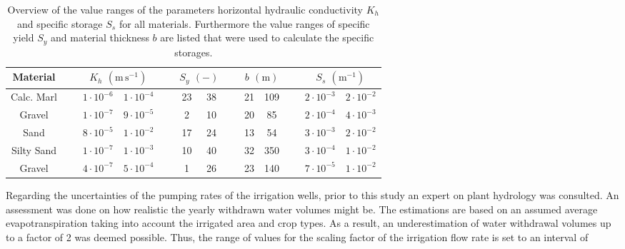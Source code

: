 \begin{table}[h]
    \label{Tab-MatPropsRange}
    \caption{Overview of the value ranges of the parameters horizontal hydraulic conductivity $K_h$ and specific storage $S_s$ for all materials. Furthermore the value ranges of specific yield $S_y$ and material thickness $b$ are listed that were used to calculate the specific storages.}
    \begin{tabular}{clcclcclcclcc}
        Material   & $\; \;$ & \multicolumn{2}{c}{$K_h$ $(\textrm{m} \, \textrm{s}^{-1})$} & $\; \;$ & \multicolumn{2}{c}{$S_y$ $(-)$} & $\; \;$ & \multicolumn{2}{c}{$b$ $(\textrm{m})$} & $\; \;$ & \multicolumn{2}{c}{$S_s$ $(\textrm{m}^{-1})$} \\ \hline
        Calc. Marl &         & $1 \cdot 10^{-6}$            & $1 \cdot 10^{-4}$            &         & 23             & 38             &         & 21                & 109                &         & $2 \cdot 10^{-3}$     & $2 \cdot 10^{-2}$     \\
        Gravel     &         & $1 \cdot 10^{-7}$            & $9 \cdot 10^{-5}$            &         & 2              & 10             &         & 20                & 85                 &         & $2 \cdot 10^{-4}$     & $4 \cdot 10^{-3}$     \\
        Sand       &         & $8 \cdot 10^{-5}$            & $1 \cdot 10^{-2}$            &         & 17             & 24             &         & 13                & 54                 &         & $3 \cdot 10^{-3}$     & $2 \cdot 10^{-2}$     \\
        Silty Sand &         & $1 \cdot 10^{-7}$            & $1 \cdot 10^{-3}$            &         & 10             & 40             &         & 32                & 350                &         & $3 \cdot 10^{-4}$     & $1 \cdot 10^{-2}$     \\
        Gravel     &         & $4 \cdot 10^{-7}$            & $5 \cdot 10^{-4}$            &         & 1              & 26             &         & 23                & 140                &         & $7 \cdot 10^{-5}$     & $1 \cdot 10^{-2}$    
    \end{tabular}
\end{table}

Regarding the uncertainties of the pumping rates of the irrigation wells, prior to this study an expert on plant hydrology was consulted. 
An assessment was done on how realistic the yearly withdrawn water volumes might be. 
The estimations are based on an assumed average evapotranspiration taking into account the irrigated area and crop types. 
As a result, an underestimation of water withdrawal volumes up to a factor of 2 was deemed possible. 
Thus, the range of values for the scaling factor of the irrigation flow rate is set to an interval of 

